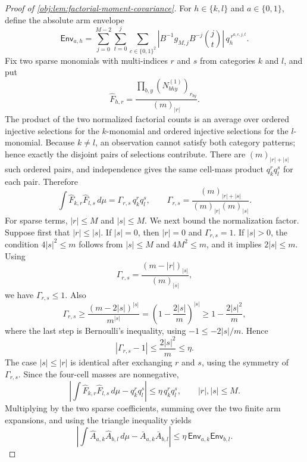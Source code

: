 \documentclass[11pt]{article}
\begin{document}
\begin{proof}[Proof of \cref{obj:lem:factorial-moment-covariance}]
For \(h\in\{k,l\}\) and \(a\in\{0,1\}\), define the absolute arm envelope
\[
\mathsf{Env}_{a,h}
=
\sum_{j=0}^{M-2}\sum_{t=0}^{j}\sum_{c\in\{0,1\}^2}
\left|B^{-1}g_{M,j}B^{-j}\binom jt\right|\,q_h^{\,r^{a,c,j,t}}.
\]
Fix two sparse monomials with multi-indices \(r\) and \(s\) from categories \(k\) and
\(l\), and put
\[
\widehat F_{h,r}=\frac{\prod_{b,y}(N^{(1)}_{bhy})_{r_{by}}}{(m)_{|r|}}.
\]
The product of the two normalized factorial counts is an average over ordered injective
selections for the \(k\)-monomial and ordered injective selections for the \(l\)-monomial.
Because \(k\ne l\), an observation cannot satisfy both category patterns; hence exactly the
disjoint pairs of selections contribute.  There are \((m)_{|r|+|s|}\) such ordered pairs,
and independence gives the same cell-mass product \(q_k^r q_l^s\) for each pair.  Therefore
\[
\int \widehat F_{k,r}\widehat F_{l,s}\,d\mu
=
\Gamma_{r,s}\,q_k^rq_l^s,
\qquad
\Gamma_{r,s}
=
\frac{(m)_{|r|+|s|}}{(m)_{|r|}(m)_{|s|}}.
\]
For sparse terms, \(|r|\le M\) and \(|s|\le M\).  We next bound the normalization factor.  Suppose
first that \(|r|\le |s|\).  If \(|s|=0\), then \(|r|=0\) and \(\Gamma_{r,s}=1\).  If
\(|s|>0\), the condition \(4|s|^2\le m\) follows from \(|s|\le M\) and \(4M^2\le m\), and it
implies \(2|s|\le m\).  Using
\[
\Gamma_{r,s}
=\frac{(m-|r|)_{|s|}}{(m)_{|s|}},
\]
we have \(\Gamma_{r,s}\le1\).  Also
\[
\Gamma_{r,s}
\ge
\frac{(m-2|s|)^{|s|}}{m^{|s|}}
=\left(1-\frac{2|s|}{m}\right)^{|s|}
\ge
1-\frac{2|s|^2}{m},
\]
where the last step is Bernoulli's inequality, using \(-1\le -2|s|/m\).  Hence
\[
|\Gamma_{r,s}-1|\le \frac{2|s|^2}{m}\le\eta .
\]
The case \(|s|\le |r|\) is identical after exchanging \(r\) and \(s\), using the symmetry of
\(\Gamma_{r,s}\).  Since the four-cell masses are nonnegative,
\[
\left|
\int \widehat F_{k,r}\widehat F_{l,s}\,d\mu-q_k^rq_l^s
\right|
\le
\eta\,q_k^rq_l^s,
\qquad |r|,|s|\le M.
\]
Multiplying by the two sparse coefficients, summing over the two finite arm expansions, and
using the triangle inequality yields
\[
\left|
\int \widehat A_{a,k}\widehat A_{b,l}\,d\mu-
\bar A_{a,k}\bar A_{b,l}
\right|
\le
\eta\,\mathsf{Env}_{a,k}\mathsf{Env}_{b,l}.
\]


\end{proof}
\end{document}
